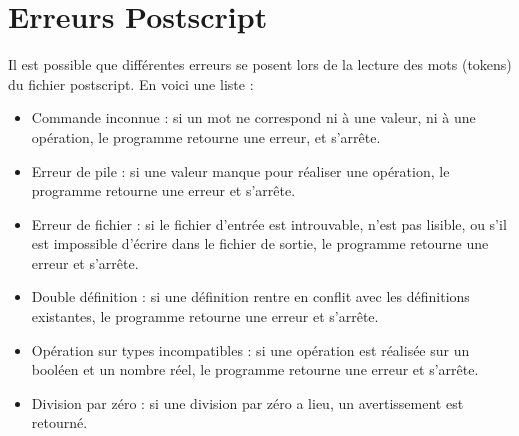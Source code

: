 \documentclass[11pt,a4paper]{article}
\begin{document}
\section{Erreurs Postscript}
Il est possible que différentes erreurs se posent lors de la lecture des mots (tokens) du fichier postscript. En voici une liste :
\begin{itemize}
\item Commande inconnue : si un mot ne correspond ni à une valeur, ni à une opération, le programme retourne une erreur, et s'arrête.
\item Erreur de pile : si une valeur manque pour réaliser une opération, le programme retourne une erreur et s'arrête.
\item Erreur de fichier : si le fichier d'entrée est introuvable, n'est pas lisible, ou s'il est impossible d'écrire dans le fichier de sortie, le programme retourne une erreur et s'arrête.
\item Double définition : si une définition rentre en conflit avec les définitions existantes, le programme retourne une erreur et s'arrête.
\item Opération sur types incompatibles : si une opération est réalisée sur un booléen et un nombre réel, le programme retourne une erreur et s'arrête.
\item Division par zéro : si une division par zéro a lieu, un avertissement est retourné.
\end{itemize}
\end{document}
